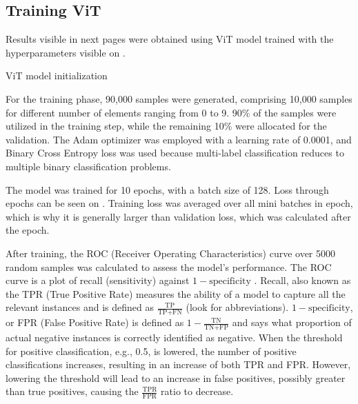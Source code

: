 \subsection{Training ViT}
Results visible in next pages were obtained using ViT model trained with the hyperparameters visible on .

\newenvironment{longlistingI}{\captionsetup{type=listing, width=0.8\textwidth}}{}
\begin{longlistingI}
    \caption{ViT model initialization}
    \label{lst:vit-hyperparameters}
\end{longlistingI}
\vspace{12pt}

For the training phase, 90,000 samples were generated, comprising 10,000 samples for different number of elements ranging from 0 to 9. 
90\% of the samples were utilized in the training step, while the remaining 10\% were allocated for the validation. 
The Adam optimizer was employed with a learning rate of 0.0001, and Binary Cross Entropy loss was used because multi-label classification reduces to multiple binary classification problems.

The model was trained for 10 epochs, with a batch size of 128. 
Loss through epochs can be seen on . 
Training loss was averaged over all mini batches in epoch, which is why it is generally larger than validation loss, which was calculated after the epoch. 

After training, the ROC (Receiver Operating Characteristics) curve over 5000 random samples was calculated to assess the model's performance. 
The ROC curve is a plot of recall (sensitivity) against $1-\text{specificity}$ \cite{rocCurve}.
Recall, also known as the TPR (True Positive Rate) measures the ability of a model to capture all the relevant instances and is defined as \(\frac{\text{TP}}{\text{TP} + \text{FN}}\) (look  for abbreviations).
$1-\text{specificity}$, or FPR (False Positive Rate) is defined as \(1 - \frac{\text{TN}}{\text{TN} + \text{FP}}\) and says what proportion of actual negative instances is correctly identified as negative.
When the threshold for positive classification, e.g., 0.5, is lowered, the number of positive classifications increases, resulting in an increase of both TPR and FPR. 
However, lowering the threshold will lead to an increase in false positives, possibly greater than true positives, causing the \(\frac{\text{TPR}}{\text{FPR}}\) ratio to decrease.

